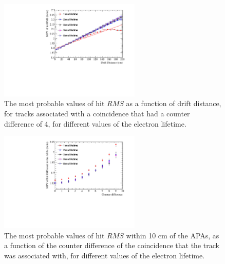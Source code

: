 \begin{figure}
  \centering
  \includegraphics[width=0.6\textwidth]{Canvas_CountDiff4_All_Positions_ElecLifetime}
  \caption[The most probable values of hit $RMS$ as a function of drift distance, for tracks associated with a coincidence that had a counter difference of 4, for different values of the electron lifetime]
          {The most probable values of hit $RMS$ as a function of drift distance, for tracks associated with a coincidence that had a counter difference of 4, for different values of the electron lifetime.}
  \label{fig:DiffLifeStudy_CDiff4}
\end{figure}

\begin{figure}
  \centering
  \includegraphics[width=0.6\textwidth]{Canvas_All_Angles_RMS0cm_ElecLifetime}
    \caption[The angular dependence of hits within 10 cm of the APAs, for different values of the electron lifetime]
            {The most probable values of hit $RMS$ within 10 cm of the APAs, as a function of the counter difference of the coincidence that the track was associated with, for different values of the electron lifetime.}
  \label{fig:DiffLifeStudy_RMS0cm}
\end{figure}

